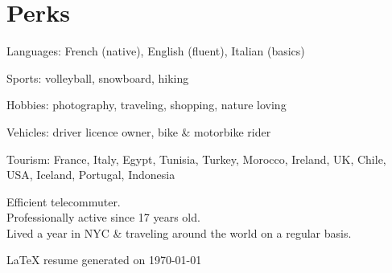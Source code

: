 \documentclass[letterpaper]{article}
\renewenvironment{itemize}{
    \begin{list}{}{
        \setlength{\leftmargin}{1.5em}
    }
}{
    \end{list}
}
\begin{document}
        \vspace{0.6cm}

    \section*{\faCompass{} Perks}

        \begin{itemize}
            \item Languages: French (native), English (fluent), Italian (basics)
            \item Sports: volleyball, snowboard, hiking
            \item Hobbies: photography, traveling, shopping, nature loving
            \item Vehicles: driver licence owner, bike \& motorbike rider
            \item Tourism: France, Italy, Egypt, Tunisia, Turkey, Morocco, Ireland, UK, Chile, USA, Iceland, Portugal, Indonesia
        \end{itemize}

        \vspace{1cm}
        Efficient telecommuter.\\
        Professionally active since 17 years old.\\
        Lived a year in NYC \& traveling around the world on a regular basis.

        \vfill

        \begin{center}
            \begin{footnotesize}
                \LaTeX{} resume generated on \today
            \end{footnotesize}
        \end{center}
\end{document}
